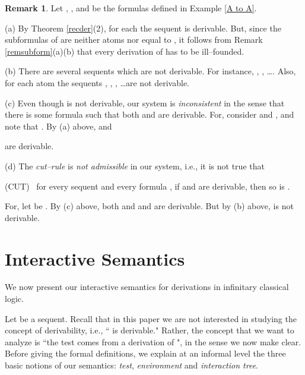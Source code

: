 \documentclass[copyright,creativecommons]{eptcs}
\def\ie{i.e., }
\theoremstyle{definition}
\newtheorem{remark}[theorem]{Remark}
\newcommand{\squishlist}{
 \begin{list}{}
  { \setlength{\itemsep}{0pt}
     \setlength{\parsep}{3pt}
     \setlength{\topsep}{3pt}
     \setlength{\partopsep}{0pt}
     \setlength{\leftmargin}{1em}
     \setlength{\labelwidth}{1.5em}
     \setlength{\labelsep}{0.5em} } }
\newcommand{\squishend}{
  \end{list}  }
\begin{document}
\begin{remark} \label{remcons} Let  , , and  be the formulas defined   in Example \ref{A to A}.

(a) By  Theorem \ref{recder}(2),  for each 
the sequent 
 is derivable.
But, since the  subformulas of   are neither atoms nor equal to ,       it follows from Remark \ref{remsubform}(a)(b) that
every derivation of   has to be ill--founded.

(b)  There are several sequents which are not derivable. For instance,
 , , \ldots. Also, for each atom   the sequents  ,
 , ,
 \ldots are not derivable.

(c) Even though  is not derivable, our system is \emph{inconsistent}
in the sense that there is some formula  such that
both   and  are derivable.
For, consider   and , and note that . By (a) above,  and
 
are derivable.

(d) The \emph{cut--rule} is \emph{not admissible} in our
system, \ie it is not true that
\squishlist
\item[ (CUT)] \ for every sequent  and every formula ,
if 
and  are  derivable, then so is
.
\squishend
For, let  be .
By (c) above, both    and
and 
are derivable. But by (b) above,  is not derivable.
 \hfill
\end{remark}





\section{Interactive Semantics} \label{sec4}

We now present our interactive semantics
for derivations in infinitary classical logic.

Let  be a sequent.
Recall that in this paper
we are not interested
in studying the concept of derivability, \ie  `` is derivable." Rather,
the concept that we want to  analyze is    ``the test  comes from a derivation
of \/", in the sense we now make clear.
Before giving the formal definitions, we explain at an informal  level the
 three basic notions of our semantics:
\emph{test}, \emph{environment} and \emph{interaction tree}. \\



\vspace{-3.5mm}
\end{document}
